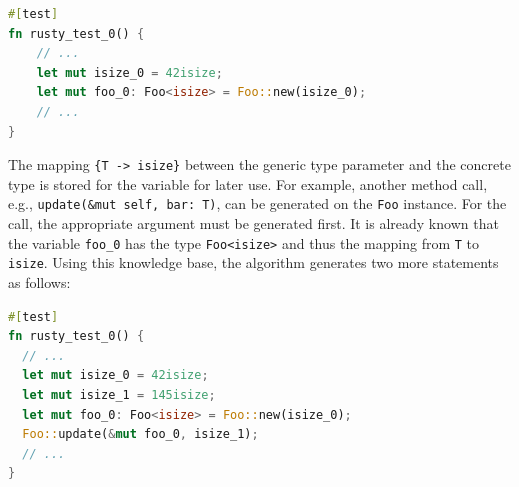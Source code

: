 \documentclass[paper=a4,%
  twoside,%
  BCOR4mm,%
  abstract=true,%
  toc=bibliography,%
  chapterprefix=true,%
  toc=bibliographynumbered,%
  open=right,%
  english,%
  pagesize=pdftex]{scrreprt}
\begin{document}
\begin{lstlisting}[language=Rust, style=boxed, caption={}, label=lst:building-generic-test-1]
#[test]
fn rusty_test_0() {
    // ...
    let mut isize_0 = 42isize;
    let mut foo_0: Foo<isize> = Foo::new(isize_0);
    // ...
}
\end{lstlisting}


The mapping \lstinline|{T -> isize}| between the generic type parameter and the concrete type is stored for the variable for later use. For example, another method call, e.g., \lstinline{update(&mut self, bar: T)}, can be generated on the \lstinline{Foo} instance. For the call, the appropriate argument must be generated first. It is already known that the variable \lstinline{foo_0} has the type \lstinline{Foo<isize>} and thus the mapping from \lstinline{T} to \lstinline{isize}. Using this knowledge base, the algorithm generates two more statements as follows:

\begin{lstlisting}[language=Rust, style=boxed, caption={}, label=lst:building-generic-test-2]
#[test]
fn rusty_test_0() {
  // ...
  let mut isize_0 = 42isize;
  let mut isize_1 = 145isize;
  let mut foo_0: Foo<isize> = Foo::new(isize_0);
  Foo::update(&mut foo_0, isize_1);
  // ...
}
\end{lstlisting}


\end{document}

